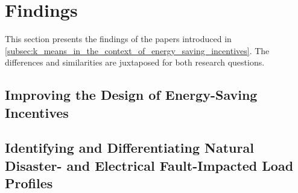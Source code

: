 \chapter{Findings}
\label{cha:findings}

This section presents the findings of the papers introduced in \autoref{subsec:k_means_in_the_context_of_energy_saving_incentives}.
The differences and similarities are juxtaposed for both research questions.

\section{Improving the Design of Energy-Saving Incentives}
\label{sec:improving_the_design_of_energy_saving_incentives}


\section{Identifying and Differentiating Natural Disaster- and Electrical Fault-Impacted Load Profiles}
\label{sec:identifying_and_differentiating_natural_disaster_and_electrical_fault_impacted_load_profiles}
